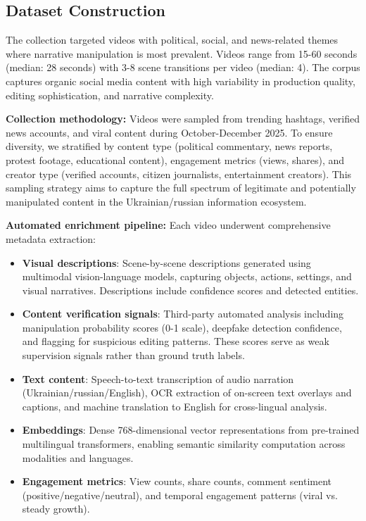 \documentclass[runningheads]{llncs}
\begin{document}
\subsection{Dataset Construction}

The collection targeted videos with political, social, and news-related themes where narrative manipulation is most prevalent. Videos range from 15-60 seconds (median: 28 seconds) with 3-8 scene transitions per video (median: 4). The corpus captures organic social media content with high variability in production quality, editing sophistication, and narrative complexity.

\textbf{Collection methodology:} Videos were sampled from trending hashtags, verified news accounts, and viral content during October-December 2025. To ensure diversity, we stratified by content type (political commentary, news reports, protest footage, educational content), engagement metrics (views, shares), and creator type (verified accounts, citizen journalists, entertainment creators). This sampling strategy aims to capture the full spectrum of legitimate and potentially manipulated content in the Ukrainian/russian information ecosystem.

\textbf{Automated enrichment pipeline:} Each video underwent comprehensive metadata extraction:
\begin{itemize}
\item \textbf{Visual descriptions}: Scene-by-scene descriptions generated using multimodal vision-language models, capturing objects, actions, settings, and visual narratives. Descriptions include confidence scores and detected entities.
\item \textbf{Content verification signals}: Third-party automated analysis including manipulation probability scores (0-1 scale), deepfake detection confidence, and flagging for suspicious editing patterns. These scores serve as weak supervision signals rather than ground truth labels.
\item \textbf{Text content}: Speech-to-text transcription of audio narration (Ukrainian/russian/English), OCR extraction of on-screen text overlays and captions, and machine translation to English for cross-lingual analysis.
\item \textbf{Embeddings}: Dense 768-dimensional vector representations from pre-trained multilingual transformers, enabling semantic similarity computation across modalities and languages.
\item \textbf{Engagement metrics}: View counts, share counts, comment sentiment (positive/negative/neutral), and temporal engagement patterns (viral vs. steady growth).
\end{itemize}
\end{document}
